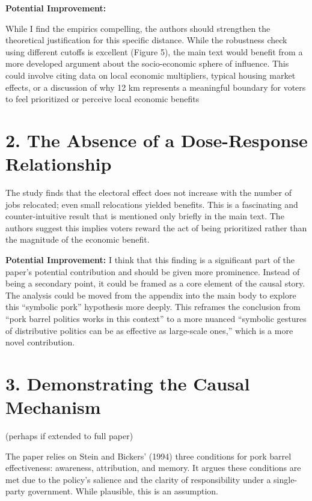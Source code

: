 \documentclass[
  letterpaper,
  DIV=11,
  numbers=noendperiod]{scrartcl}
\begin{document}
\textbf{Potential Improvement:}

While I find the empirics compelling, the authors should strengthen the
theoretical justification for this specific distance. While the
robustness check using different cutoffs is excellent (Figure 5), the
main text would benefit from a more developed argument about the
socio-economic sphere of influence. This could involve citing data on
local economic multipliers, typical housing market effects, or a
discussion of why 12 km represents a meaningful boundary for voters to
feel prioritized or perceive local economic benefits

\section{2. The Absence of a Dose-Response
Relationship}\label{the-absence-of-a-dose-response-relationship}

The study finds that the electoral effect does not increase with the
number of jobs relocated; even small relocations yielded benefits. This
is a fascinating and counter-intuitive result that is mentioned only
briefly in the main text. The authors suggest this implies voters reward
the act of being prioritized rather than the magnitude of the economic
benefit.

\textbf{Potential Improvement:} I think that this finding is a
significant part of the paper's potential contribution and should be
given more prominence. Instead of being a secondary point, it could be
framed as a core element of the causal story. The analysis could be
moved from the appendix into the main body to explore this ``symbolic
pork'' hypothesis more deeply. This reframes the conclusion from ``pork
barrel politics works in this context'' to a more nuanced ``symbolic
gestures of distributive politics can be as effective as large-scale
ones,'' which is a more novel contribution.

\section{3. Demonstrating the Causal
Mechanism}\label{demonstrating-the-causal-mechanism}

(perhaps if extended to full paper)

The paper relies on Stein and Bickers' (1994) three conditions for pork
barrel effectiveness: awareness, attribution, and memory. It argues
these conditions are met due to the policy's salience and the clarity of
responsibility under a single-party government. While plausible, this is
an assumption.
\end{document}
